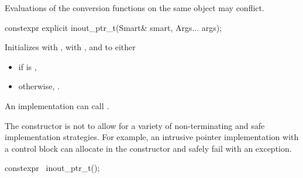 \pnum
Evaluations of the conversion functions on the same object
may conflict.

%
\begin{itemdecl}
constexpr explicit inout_ptr_t(Smart& smart, Args... args);
\end{itemdecl}

\begin{itemdescr}
\pnum
\effects
Initializes  with ,
 with , and
 to either
\begin{itemize}
\item {} if  is ,
\item otherwise, .
\end{itemize}

\pnum
\remarks
An implementation can call .

\pnum
\begin{note}
The constructor is not 
to allow for a variety of non-terminating and safe implementation strategies.
For example, an intrusive pointer implementation with a control block
can allocate in the constructor and safely fail with an exception.
\end{note}
\end{itemdescr}

%
\begin{itemdecl}
constexpr ~inout_ptr_t();
\end{itemdecl}

